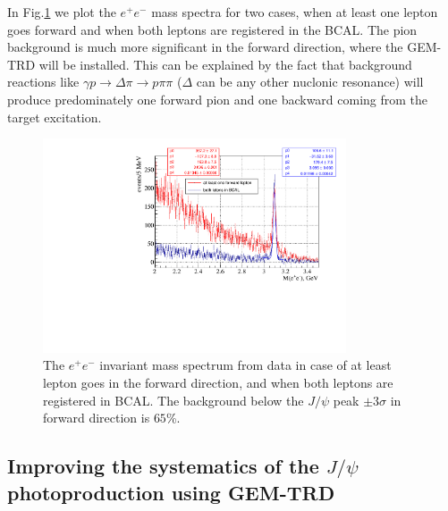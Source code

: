 \documentclass[%
preprint,
nofootinbib,
 amsmath,amssymb,
 aps,
floatfix,
]{revtex4-1}
\begin{document}
In Fig.\ref{fig:minv_BFCAL} we plot the  $e^+e^-$ mass spectra for two cases,
when at least one lepton goes forward and when both leptons are registered 
in the BCAL.
The pion background is much more significant in the forward direction,
where the GEM-TRD will be installed.
This can be explained by the fact that background reactions like 
$\gamma p \to \Delta \pi \to p \pi \pi$ ($\Delta $ can be any other nuclonic resonance)
will produce predominately one forward pion and one backward 
coming from the target excitation.
\begin{figure}[]
\includegraphics[width=0.80\textwidth]{./fig/GEM_TRD_Minv_one_in_FCAL_comp.pdf}
  \caption{
The $e^+e^-$ invariant mass spectrum from data  
in case of at least lepton goes in the forward direction,
and when both leptons are registered in BCAL.
The background below the $J/\psi $ peak $\pm 3\sigma $ in forward direction is $65$\%.
}
  \label{fig:minv_BFCAL}
\end{figure}


\subsection{Improving the systematics of the $J/\psi $ photoproduction
using GEM-TRD}
\end{document}
